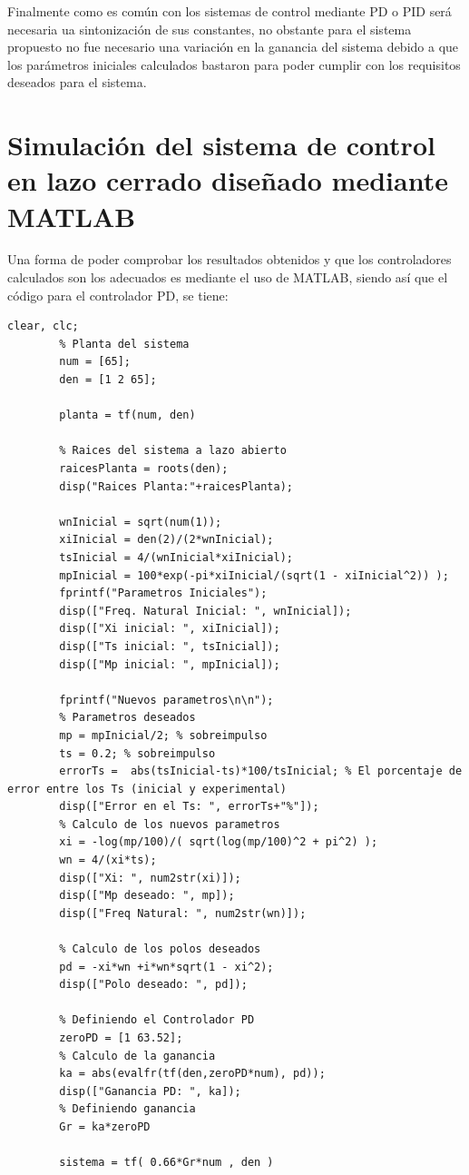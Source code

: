 \documentclass[conference]{IEEEtran}
\begin{document}
	Finalmente como es común con los sistemas de control mediante PD o PID será necesaria ua sintonización de sus constantes, no obstante para el sistema propuesto no fue necesario una variación en la ganancia del sistema debido a que los parámetros iniciales calculados bastaron para poder cumplir con los requisitos deseados para el sistema.
	
	\section{Simulación del sistema de control en lazo cerrado diseñado mediante MATLAB}
	Una forma de poder comprobar los resultados obtenidos y que los controladores calculados son los adecuados es mediante el uso de MATLAB, siendo así que el código para el controlador PD, se tiene:
	\begin{lstlisting}[numbers=none, caption={Controlador PD}]
		clear, clc;
		% Planta del sistema
		num = [65];
		den = [1 2 65];
		
		planta = tf(num, den)
		
		% Raices del sistema a lazo abierto
		raicesPlanta = roots(den);
		disp("Raices Planta:"+raicesPlanta);
		
		wnInicial = sqrt(num(1));
		xiInicial = den(2)/(2*wnInicial);
		tsInicial = 4/(wnInicial*xiInicial);
		mpInicial = 100*exp(-pi*xiInicial/(sqrt(1 - xiInicial^2)) );
		fprintf("Parametros Iniciales");
		disp(["Freq. Natural Inicial: ", wnInicial]);
		disp(["Xi inicial: ", xiInicial]);
		disp(["Ts inicial: ", tsInicial]);
		disp(["Mp inicial: ", mpInicial]);
		
		fprintf("Nuevos parametros\n\n");
		% Parametros deseados
		mp = mpInicial/2; % sobreimpulso
		ts = 0.2; % sobreimpulso
		errorTs =  abs(tsInicial-ts)*100/tsInicial; % El porcentaje de error entre los Ts (inicial y experimental)
		disp(["Error en el Ts: ", errorTs+"%"]);
		% Calculo de los nuevos parametros
		xi = -log(mp/100)/( sqrt(log(mp/100)^2 + pi^2) );
		wn = 4/(xi*ts);
		disp(["Xi: ", num2str(xi)]);
		disp(["Mp deseado: ", mp]);
		disp(["Freq Natural: ", num2str(wn)]);
		
		% Calculo de los polos deseados
		pd = -xi*wn +i*wn*sqrt(1 - xi^2);
		disp(["Polo deseado: ", pd]);
		
		% Definiendo el Controlador PD
		zeroPD = [1 63.52];
		% Calculo de la ganancia
		ka = abs(evalfr(tf(den,zeroPD*num), pd));
		disp(["Ganancia PD: ", ka]);
		% Definiendo ganancia
		Gr = ka*zeroPD
		
		sistema = tf( 0.66*Gr*num , den )
		

\end{lstlisting}
\end{document}
